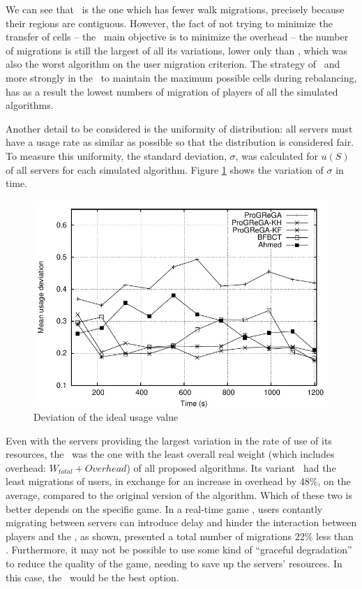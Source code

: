 	
We can see that \ggp\ is the one which has fewer walk migrations, precisely because their regions are contiguous. However, the fact of not trying to minimize the transfer of cells -- the \ggp\ main objective is to minimize the overhead -- the number of migrations is still the largest of all its variations, lower only than \bfa, which was also the worst algorithm on the user migration criterion. The strategy of \ggpk\, and more strongly in the \ggpf\, to maintain the maximum possible cells during rebalancing, has as a result the lowest numbers of migration of players of all the simulated algorithms.

Another detail to be considered is the uniformity of distribution: all servers must have a usage rate as similar as possible so that the distribution is considered fair. To measure this uniformity, the standard deviation, $\sigma$, was calculated for $u(S)$ of all servers for each simulated algorithm. Figure \ref{gra:baldeviation} shows the variation of $\sigma$ in time.

\begin{figure}[!t]
  \centering
  \includegraphics[width=0.9\linewidth]{images/baldeviation_ah}
  \caption{Deviation of the ideal usage value}
  \label{gra:baldeviation}
\end{figure}

Even with the servers providing the largest variation in the rate of use of its resources, the \ggp\ was the one with the least overall real weight (which includes overhead: $W_{total} + Overhead$) of all proposed algorithms. Its variant \ggpf\ had the least migrations of users, in exchange for an increase in overhead by 48\%, on the average, compared to the original version of the algorithm. Which of these two is better depends on the specific game. In a real-time game , users contantly migrating between servers can introduce delay and hinder the interaction between players and the \ggpf, as shown, presented a total number of migrations 22\% less than \ggp. Furthermore, it may not be possible to use some kind of ``graceful degradation'' to reduce the quality of the game, needing to save up the servers' resources. In this case, the \ggp\ would be the best option.


